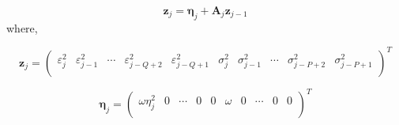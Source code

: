 \documentclass[10pt,a4paper,oneside]{article}
\begin{document}
\begin{equation}
    \mathbf{z}_j = \boldsymbol{\eta}_j + \mathbf{A}_j \mathbf{z}_{j - 1}
    \label{eq:markov_rep_garch}
\end{equation}
where,

\[
    \mathbf{z}_j =
    \begin{pmatrix}
        \varepsilon_j^2 & \varepsilon_{j - 1}^2 & \cdots & \varepsilon_{j - Q + 2}^2 & \varepsilon_{j - Q + 1}^2 & \sigma^2_{j} & \sigma^2_{j - 1} & \cdots & \sigma^2_{j - P + 2} & \sigma^2_{j - P + 1} \\
    \end{pmatrix}^T
\]


\[
    \mathbf{\eta}_j =
    \begin{pmatrix}
        \omega \eta_j^2 & 0 & \cdots & 0 & 0 & \omega & 0 & \cdots & 0 & 0 \\
    \end{pmatrix}^T
\]
\end{document}
